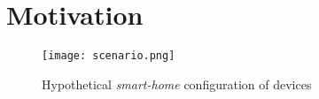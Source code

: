 \section{Motivation}
\label{sec:Motivation}

\begin{figure}%
	\centering  
	\texttt{[image: scenario.png]}%
	\caption{Hypothetical \textit{smart-home} configuration of \IOT devices}%
	\label{fig:scenario}%
\end{figure}